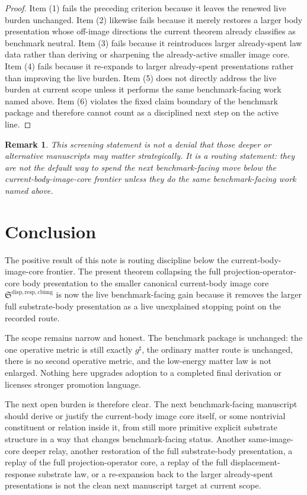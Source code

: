 \documentclass[11pt]{article}
\newcommand{\CompletedMetric}{g^{\sharp}}
\newcommand{\CurrentBodyImageCore}{\mathfrak S^{\mathrm{disp,resp,cbimg}}}
\newtheorem{remark}{Remark}
\begin{document}
\begin{proof}
Item (1) fails the preceding criterion because it leaves the renewed live burden unchanged. Item (2) likewise fails because it merely restores a larger body presentation whose off-image directions the current theorem already classifies as benchmark neutral. Item (3) fails because it reintroduces larger already-spent law data rather than deriving or sharpening the already-active smaller image core. Item (4) fails because it re-expands to larger already-spent presentations rather than improving the live burden. Item (5) does not directly address the live burden at current scope unless it performs the same benchmark-facing work named above. Item (6) violates the fixed claim boundary of the benchmark package and therefore cannot count as a disciplined next step on the active line.
\end{proof}

\begin{remark}
This screening statement is not a denial that those deeper or alternative manuscripts may matter strategically. It is a routing statement: they are not the default way to spend the next benchmark-facing move below the current-body-image-core frontier unless they do the same benchmark-facing work named above.
\end{remark}

\section{Conclusion}

The positive result of this note is routing discipline below the current-body-image-core frontier. The present theorem collapsing the full projection-operator-core body presentation to the smaller canonical current-body image core \(\CurrentBodyImageCore\) is now the live benchmark-facing gain because it removes the larger full substrate-body presentation as a live unexplained stopping point on the recorded route.

The scope remains narrow and honest. The benchmark package is unchanged: the one operative metric is still exactly \(\CompletedMetric\), the ordinary matter route is unchanged, there is no second operative metric, and the low-energy matter law is not enlarged. Nothing here upgrades adoption to a completed final derivation or licenses stronger promotion language.

The next open burden is therefore clear. The next benchmark-facing manuscript should derive or justify the current-body image core itself, or some nontrivial constituent or relation inside it, from still more primitive explicit substrate structure in a way that changes benchmark-facing status. Another same-image-core deeper relay, another restoration of the full substrate-body presentation, a replay of the full projection-operator core, a replay of the full displacement-response substrate law, or a re-expansion back to the larger already-spent presentations is not the clean next manuscript target at current scope.
\end{document}
